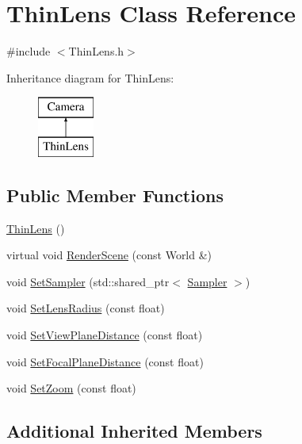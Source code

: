 \hypertarget{class_thin_lens}{}\section{Thin\+Lens Class Reference}
\label{class_thin_lens}


{\ttfamily \#include $<$Thin\+Lens.\+h$>$}

Inheritance diagram for Thin\+Lens\+:\begin{figure}[H]
\begin{center}
\leavevmode
\includegraphics[height=2.000000cm]{class_thin_lens}
\end{center}
\end{figure}
\subsection*{Public Member Functions}
\begin{DoxyCompactItemize}
\item 
\hyperlink{class_thin_lens_ae458cc9405f705ec7c8cbffca08e23b2}{Thin\+Lens} ()
\item 
virtual void \hyperlink{class_thin_lens_af33d499e8fdbdbd196ba3a9b28bdaf5c}{Render\+Scene} (const World \&)
\item 
void \hyperlink{class_thin_lens_acf205ce5a21bd65783c2e67c056664c8}{Set\+Sampler} (std\+::shared\+\_\+ptr$<$ \hyperlink{class_sampler}{Sampler} $>$)
\item 
void \hyperlink{class_thin_lens_a5d4e3ec359df6ebb4dc5163fa48acfc5}{Set\+Lens\+Radius} (const float)
\item 
void \hyperlink{class_thin_lens_a5979bace2e20ea3ede301dff105c403e}{Set\+View\+Plane\+Distance} (const float)
\item 
void \hyperlink{class_thin_lens_a8b14ebeb4fd25147301eba27d8a5530d}{Set\+Focal\+Plane\+Distance} (const float)
\item 
void \hyperlink{class_thin_lens_a10121e3990c0a9bf61394440d2e85421}{Set\+Zoom} (const float)
\end{DoxyCompactItemize}
\subsection*{Additional Inherited Members}



